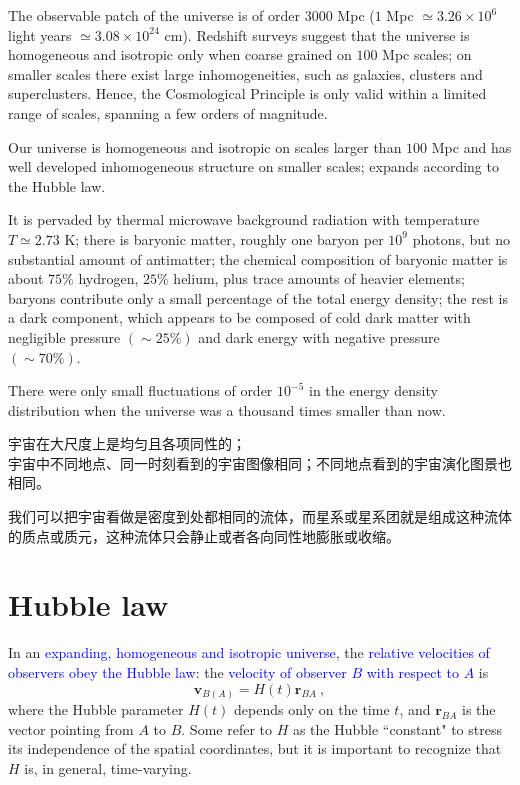 \documentclass[12pt,a4paper]{article}
\renewcommand{\vec}[1]{\boldsymbol{#1}}
\begin{document}
\cite{mukhanov2005physical} The observable patch of the universe is of order $3000$ Mpc ($1$ Mpc $\simeq 3.26 \times 10^6$ light years $\simeq 3.08 \times 10^{24}$ cm). Redshift surveys suggest that the universe is homogeneous and isotropic only when coarse grained on $100$ Mpc scales; on smaller scales there exist large inhomogeneities, such as galaxies, clusters and superclusters. Hence, the Cosmological Principle is only valid within a limited range of scales, spanning a few orders of magnitude.

Our universe is homogeneous and isotropic on scales larger than $100$ Mpc and has well developed inhomogeneous structure on smaller scales; expands according to the Hubble law.

It is pervaded by thermal microwave background radiation with temperature $T \simeq 2.73$ K; there is baryonic matter, roughly one baryon per $10^9$ photons, but no substantial amount of antimatter; the chemical composition of baryonic matter is about $75\%$ hydrogen, $25\%$ helium, plus trace amounts of heavier elements; baryons contribute only a small percentage of the total energy density; the rest is a dark component, which appears to be composed of cold dark matter with negligible pressure $(\sim 25\%)$ and dark energy with negative pressure $(\sim 70\%)$.

There were only small fluctuations of order $10^{-5}$ in the energy density distribution when the universe was a thousand times smaller than now.


\cite{2010宇宙大尺度结构的形成, 2012宇宙大尺度结构的形成} 

\begin{tcolorbox}[colback=green!5,colframe=green!40!black,title= 宇宙学原理]
宇宙在大尺度上是均匀且各项同性的；\\
宇宙中不同地点、同一时刻看到的宇宙图像相同；不同地点看到的宇宙演化图景也相同。
\end{tcolorbox}
我们可以把宇宙看做是密度到处都相同的流体，而星系或星系团就是组成这种流体的质点或质元，这种流体只会静止或者各向同性地膨胀或收缩。

\section{Hubble law}
\cite{mukhanov2005physical} In an \textcolor{blue}{expanding, homogeneous and isotropic universe}, the \textcolor{blue}{relative velocities of observers obey the Hubble law}: the \textcolor{blue}{velocity of observer $B$ with respect to $A$} is
\begin{equation}
\vec{v}_{B(A)} = H(t) \vec{r}_{BA} ~,
\end{equation}
where the Hubble parameter $H(t)$ depends only on the time $t$, and $\vec{r}_{BA}$ is the vector pointing from $A$ to $B$. Some refer to $H$ as the Hubble ``constant" to stress its independence of the spatial coordinates, but it is important to recognize that $H$ is, in general, time-varying.
\end{document}

